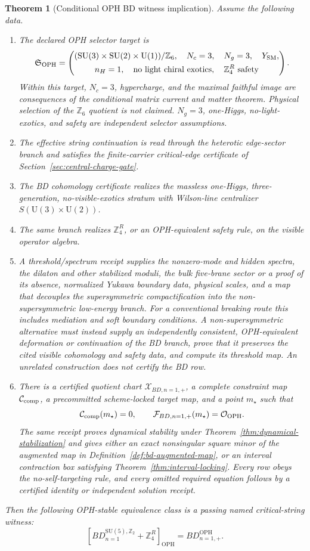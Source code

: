 \documentclass[11pt]{article}
\newtheorem{theorem}{Theorem}[section]
\theoremstyle{remark}
\theoremstyle{plain}
\newcommand{\OPH}{\mathrm{OPH}}
\newcommand{\SU}{\mathrm{SU}}
\newcommand{\U}{\mathrm{U}}
\newcommand{\Z}{\mathbb Z}
\newcommand{\calF}{\mathcal F}
\newcommand{\calO}{\mathcal O}
\newcommand{\ZfourR}{\mathbb Z_4^R}
\begin{document}
\begin{theorem}[Conditional OPH BD witness implication]
Assume the following data.
\begin{enumerate}[leftmargin=2em]
\item The declared OPH selector target is
\[
\mathfrak S_{\OPH}=
\left(
\begin{gathered}
(\SU(3)\times\SU(2)\times\U(1))/\Z_6,\quad N_c=3,\quad N_g=3,\quad Y_{\rm SM},\\
n_H=1,\quad \text{no light chiral exotics},\quad \ZfourR\text{ safety}
\end{gathered}
\right).
\]
Within this target, \(N_c=3\), hypercharge, and the maximal faithful image are consequences of
the conditional matrix current and matter theorem. Physical selection of the
\(\mathbb Z_6\) quotient is not claimed.
\(N_g=3\), one-Higgs, no-light-exotics, and safety are independent selector assumptions.
\item The effective string continuation is read through the heterotic edge-sector branch and
satisfies the finite-carrier critical-edge certificate of Section~\ref{sec:central-charge-gate}.
\item The BD cohomology certificate realizes the massless one-Higgs, three-generation,
no-visible-exotics stratum with Wilson-line centralizer \(S(\U(3)\times\U(2))\).
\item The same branch realizes \(\ZfourR\), or an OPH-equivalent safety rule, on the visible
operator algebra.
\item A threshold/spectrum receipt supplies the nonzero-mode and hidden spectra, the dilaton and
other stabilized moduli, the bulk five-brane sector or a proof of its absence, normalized Yukawa
boundary data, physical scales, and a map that decouples the supersymmetric compactification into the non-supersymmetric
low-energy branch. For a conventional breaking route this includes mediation and soft boundary
conditions. A non-supersymmetric alternative must instead supply an independently consistent,
OPH-equivalent deformation or continuation of the BD branch, prove that it preserves the cited
visible cohomology and safety data, and compute its threshold map. An unrelated construction does
not certify the BD row.
\item There is a certified quotient chart \(\mathcal X_{BD,n=1,+}\), a complete constraint map
\(\mathcal C_{\rm comp}\), a precommitted scheme-locked target map, and a point \(m_\star\) such
that
\[
\mathcal C_{\rm comp}(m_\star)=0,
\qquad
\calF_{BD,n=1,+}(m_\star)=\calO_{\OPH}.
\]
The same receipt proves dynamical stability under Theorem~\ref{thm:dynamical-stabilization}
and gives either an exact nonsingular square minor of the augmented map in
Definition~\ref{def:bd-augmented-map}, or an interval contraction box satisfying
Theorem~\ref{thm:interval-locking}. Every row obeys the no-self-targeting rule, and every omitted
required equation follows by a certified identity or independent solution receipt.
\end{enumerate}
Then the following OPH-stable equivalence class is a passing named critical-string witness:
\[
\boxed{
\left[
BD_{n=1}^{\SU(5),\Z_2}+\ZfourR
\right]_{\OPH}
=
BD_{n=1,+}^{\OPH}.
}
\]
\end{theorem}
\end{document}
